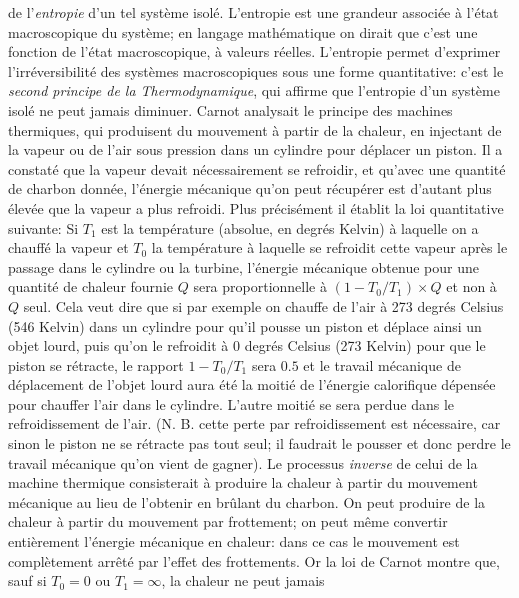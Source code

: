de l'{\it entropie} d'un tel syst\`eme isol\'e. L'entropie est une grandeur 
associ\'ee \`a l'\'etat macroscopique du syst\`eme; en langage math\'ematique 
on dirait que c'est une fonction de l'\'etat macroscopique, \`a valeurs 
r\'eelles.  L'entropie permet d'exprimer l'irr\'eversibilit\'e des 
syst\`emes macroscopiques sous une forme quantitative: c'est le 
{\it second principe de la Thermodynamique}, qui affirme que l'entropie 
d'un syst\`eme isol\'e ne peut jamais diminuer. Carnot analysait le principe 
des machines thermiques, qui produisent du mouvement \`a partir de la 
chaleur, en injectant de la vapeur ou de l'air sous pression dans un 
cylindre pour d\'eplacer un piston. Il a constat\'e que la vapeur devait 
n\'ecessairement se refroidir, et qu'avec une quantit\'e de charbon 
donn\'ee, l'\'energie m\'ecanique qu'on peut r\'ecup\'erer est d'autant 
plus \'elev\'ee que la vapeur a plus refroidi. Plus pr\'ecis\'ement il 
\'etablit la loi quantitative suivante: Si $T_1$ est la temp\'erature 
(absolue, en degr\'es Kelvin) \`a laquelle on a chauff\'e la vapeur et 
$T_0$ la temp\'erature \`a laquelle se refroidit cette vapeur apr\`es le 
passage dans le cylindre ou la turbine, l'\'energie m\'ecanique obtenue 
pour une quantit\'e de chaleur fournie $Q$ sera proportionnelle \`a 
$(1 - T_0/T_1) \times Q$ et non \`a $Q$ seul. Cela veut dire que si 
par exemple on chauffe de l'air \`a 273 degr\'es Celsius (546 Kelvin) 
dans un cylindre pour qu'il pousse un piston et d\'eplace ainsi un objet 
lourd, puis qu'on le refroidit \`a 0 degr\'es Celsius (273 Kelvin) pour que 
le piston se r\'etracte, le rapport $1 - T_0/T_1$ sera $0.5$ et le travail 
m\'ecanique de d\'eplacement de l'objet lourd aura \'et\'e la moiti\'e de 
l'\'energie calorifique d\'epens\'ee pour chauffer l'air dans le cylindre. 
L'autre moiti\'e se sera perdue dans le refroidissement de l'air. (N. B. 
cette perte par refroidissement est n\'ecessaire, car sinon le piston ne se
r\'etracte pas tout seul; il faudrait le pousser et donc perdre le
travail m\'ecanique qu'on vient de gagner).
\medskip
Le processus {\it inverse} de celui de la machine thermique consisterait 
\`a produire la chaleur \`a partir du mouvement m\'ecanique au lieu de 
l'obtenir en br\^ulant du  charbon. On peut produire de la chaleur \`a 
partir du mouvement par frottement; on peut m\^eme convertir enti\`erement 
l'\'energie m\'ecanique en chaleur: dans ce cas le mouvement est 
compl\`etement arr\^et\'e par l'effet des frottements. Or la loi de Carnot 
montre que, sauf si $T_0 = 0$ ou $T_1 = \infty$, la chaleur ne peut jamais 
